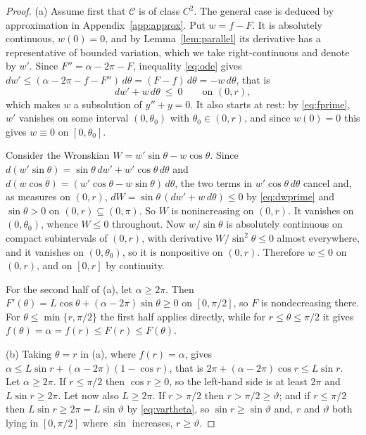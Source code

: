 \documentclass[11pt,oneside,reqno]{amsart}
\theoremstyle{plain}
\theoremstyle{definition}
\begin{document}
\begin{proof}
(a) Assume first that $\mathcal{C}$ is of class $C^{2}$. The general case is
deduced by approximation in Appendix~\ref{app:approx}. Put $w=f-F$. It is absolutely continuous,
$w(0)=0$, and by Lemma~\ref{lem:parallel} its derivative has a representative of
bounded variation, which we take right-continuous and denote by $w'$. Since
$F''=\alpha-2\pi-F$, inequality \eqref{eq:ode} gives
$dw'\le(\alpha-2\pi-f-F'')\,d\theta=(F-f)\,d\theta=-w\,d\theta$, that is
\begin{equation}\label{eq:dwprime}
  dw'+w\,d\theta\ \le\ 0\qquad\text{on }(0,r),
\end{equation}
which makes $w$ a subsolution of $y''+y=0$. It also starts at rest: by
\eqref{eq:fprime}, $w'$ vanishes on some interval $(0,\theta_{0})$ with
$\theta_{0}\in(0,r)$, and since $w(0)=0$ this gives $w\equiv0$ on
$[0,\theta_{0}]$.

Consider the Wronskian $W=w'\sin\theta-w\cos\theta$. Since
$d(w'\sin\theta)=\sin\theta\,dw'+w'\cos\theta\,d\theta$ and
$d(w\cos\theta)=(w'\cos\theta-w\sin\theta)\,d\theta$, the two terms in
$w'\cos\theta\,d\theta$ cancel and, as measures on $(0,r)$,
$dW=\sin\theta\,(dw'+w\,d\theta)\le0$ by \eqref{eq:dwprime} and
$\sin\theta>0$ on $(0,r)\subseteq(0,\pi)$. So $W$ is
nonincreasing on $(0,r)$. It vanishes on $(0,\theta_{0})$, whence $W\le0$
throughout. Now $w/\sin\theta$ is absolutely continuous on compact subintervals
of $(0,r)$, with derivative $W/\sin^{2}\theta\le0$ almost everywhere, and it
vanishes on $(0,\theta_{0})$, so it is nonpositive on $(0,r)$. Therefore
$w\le0$ on $(0,r)$, and on $[0,r]$ by continuity.

For the second half of (a), let $\alpha\ge2\pi$. Then
$F'(\theta)=L\cos\theta+(\alpha-2\pi)\sin\theta\ge0$ on $[0,\pi/2]$, so $F$ is
nondecreasing there. For $\theta\le\min\{r,\pi/2\}$ the first half applies
directly, while for $r\le\theta\le\pi/2$ it gives
$f(\theta)=\alpha=f(r)\le F(r)\le F(\theta)$.

(b) Taking $\theta=r$ in (a), where $f(r)=\alpha$, gives
$\alpha\le L\sin r+(\alpha-2\pi)(1-\cos r)$, that is
$2\pi+(\alpha-2\pi)\cos r\le L\sin r$. Let $\alpha\ge2\pi$. If $r\le\pi/2$ then
$\cos r\ge0$, so the left-hand side is at least $2\pi$ and $L\sin r\ge2\pi$. Let
now also $L\ge2\pi$. If $r>\pi/2$ then $r>\pi/2\ge\vartheta$; and if
$r\le\pi/2$ then $L\sin r\ge2\pi=L\sin\vartheta$ by \eqref{eq:vartheta}, so
$\sin r\ge\sin\vartheta$ and, $r$ and $\vartheta$ both lying in $[0,\pi/2]$
where $\sin$ increases, $r\ge\vartheta$.
\end{proof}
\end{document}
